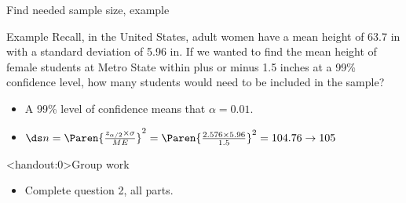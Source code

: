 \documentclass[xcolor=table]{beamer}
\begin{document}
\begin{frame}{Find needed sample size, example}
\begin{exampleblock}{Example}
\large
Recall, in the United States, adult women have a mean height of 63.7 in with a standard deviation of 5.96 in. If we wanted to find the mean height of female students at Metro State within plus or minus 1.5 inches at a 99\% confidence level, how many students would need to be included in the sample?

\begin{itemize}
\pause\item A 99\% level of confidence means that $\alpha = 0.01$.
\pause\item $\ds n = \Paren{\frac{z_{\alpha/2} \times \sigma}{ME}}^2= \Paren{\frac{2.576 \times 5.96}{1.5}}^2 = 104.76 \to 105$
\end{itemize}
\end{exampleblock}
\end{frame}

\begin{frame}<handout:0>{Group work}
\begin{block}{}
\large
\begin{itemize}
\item Complete question 2, all parts.
\end{itemize}
\end{block}
\end{frame}
\end{document}
